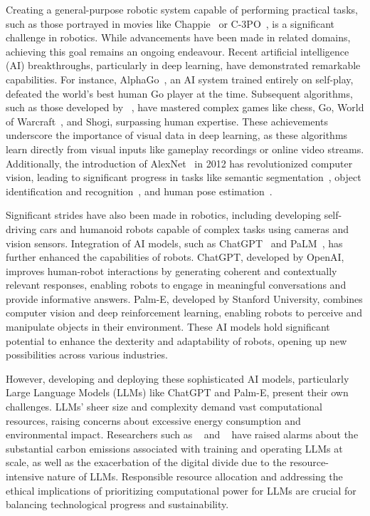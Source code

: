 Creating a general-purpose robotic system capable of performing practical tasks, such as those portrayed
in movies like Chappie~\cite{blomkamp2015chappie} or C-3PO~\cite{lucas1977star}, is a significant challenge in robotics.
While advancements have been made in related domains, achieving this goal remains an ongoing endeavour.
Recent artificial intelligence (AI) breakthroughs, particularly in deep learning, have demonstrated remarkable capabilities.
For instance, AlphaGo~\cite{silver2018general}, an AI system trained entirely on self-play, defeated the world's best human
Go player at the time. Subsequent algorithms, such as those developed by \citeauthor{silver2016mastering}~\cite{silver2016mastering},
have mastered complex games like chess, Go, World of Warcraft~\cite{entertainment2013world},
and Shogi, surpassing human expertise. These achievements underscore the importance of visual data in
deep learning, as these algorithms learn directly from visual inputs like gameplay recordings or online video streams.
Additionally, the introduction of AlexNet~\cite{krizhevsky2017imagenet} in 2012 has revolutionized computer vision,
leading to significant progress in tasks like semantic segmentation~\cite{long2015fully}, object identification
and recognition~\cite{he2017mask}, and human pose estimation~\cite{guler2018densepose}.

Significant strides have also been made in robotics, including developing self-driving cars and humanoid robots capable
of complex tasks using cameras and vision sensors. Integration of AI models, such as ChatGPT~\cite{openai2023gpt4} and
PaLM~\cite{palm}, has further enhanced the capabilities of robots. ChatGPT, developed by OpenAI, improves
human-robot interactions by generating coherent and contextually relevant responses, enabling robots to engage
in meaningful conversations and provide informative answers. Palm-E, developed by Stanford University, combines
computer vision and deep reinforcement learning, enabling robots to perceive and manipulate objects in their environment.
These AI models hold significant potential to enhance the dexterity and adaptability of robots, opening up new
possibilities across various industries.

However, developing and deploying these sophisticated AI models, particularly Large Language Models (LLMs)
like ChatGPT and Palm-E, present their own challenges. LLMs' sheer size and complexity demand vast computational resources,
raising concerns about excessive energy consumption and environmental impact. Researchers such as ~\cite{bender2021dangers}
and \citeauthor{strubell2019energy}~\cite{strubell2019energy} have raised alarms about the substantial carbon emissions associated with training and operating
LLMs at scale, as well as the exacerbation
of the digital divide due to the resource-intensive nature of LLMs. Responsible resource allocation and addressing the ethical implications
of prioritizing computational power for LLMs are crucial for balancing technological progress and sustainability.

